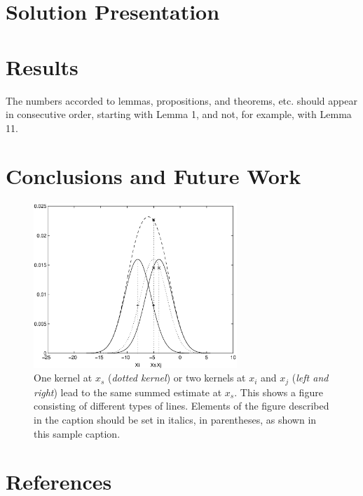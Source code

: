 \documentclass[runningheads,a4paper]{llncs}
\begin{document}
\section{Solution Presentation}


\section{Results}

The numbers accorded to lemmas, propositions, and theorems, etc. should
appear in consecutive order, starting with Lemma 1, and not, for
example, with Lemma 11.

\section{Conclusions and Future Work}

\begin{figure}
\centering
\includegraphics[height=6.2cm]{eijkel2}
\caption{One kernel at $x_s$ (\emph{dotted kernel}) or two kernels at
$x_i$ and $x_j$ (\textit{left and right}) lead to the same summed estimate
at $x_s$. This shows a figure consisting of different types of
lines. Elements of the figure described in the caption should be set in
italics, in parentheses, as shown in this sample caption.}
\label{fig:example}
\end{figure}


\section{References}
\end{document}
